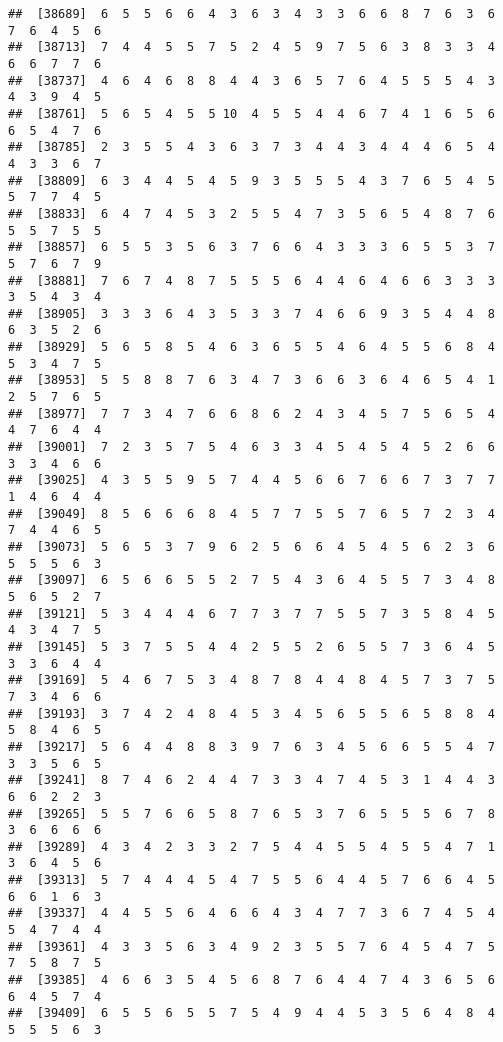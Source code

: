 \documentclass[
]{book}
\begin{document}
\begin{verbatim}
##  [38689]  6  5  5  6  6  4  3  6  3  4  3  3  6  6  8  7  6  3  6  7  6  4  5  6
##  [38713]  7  4  4  5  5  7  5  2  4  5  9  7  5  6  3  8  3  3  4  6  6  7  7  6
##  [38737]  4  6  4  6  8  8  4  4  3  6  5  7  6  4  5  5  5  4  3  4  3  9  4  5
##  [38761]  5  6  5  4  5  5 10  4  5  5  4  4  6  7  4  1  6  5  6  6  5  4  7  6
##  [38785]  2  3  5  5  4  3  6  3  7  3  4  4  3  4  4  4  6  5  4  4  3  3  6  7
##  [38809]  6  3  4  4  5  4  5  9  3  5  5  5  4  3  7  6  5  4  5  5  7  7  4  5
##  [38833]  6  4  7  4  5  3  2  5  5  4  7  3  5  6  5  4  8  7  6  5  5  7  5  5
##  [38857]  6  5  5  3  5  6  3  7  6  6  4  3  3  3  6  5  5  3  7  5  7  6  7  9
##  [38881]  7  6  7  4  8  7  5  5  5  6  4  4  6  4  6  6  3  3  3  3  5  4  3  4
##  [38905]  3  3  3  6  4  3  5  3  3  7  4  6  6  9  3  5  4  4  8  6  3  5  2  6
##  [38929]  5  6  5  8  5  4  6  3  6  5  5  4  6  4  5  5  6  8  4  5  3  4  7  5
##  [38953]  5  5  8  8  7  6  3  4  7  3  6  6  3  6  4  6  5  4  1  2  5  7  6  5
##  [38977]  7  7  3  4  7  6  6  8  6  2  4  3  4  5  7  5  6  5  4  4  7  6  4  4
##  [39001]  7  2  3  5  7  5  4  6  3  3  4  5  4  5  4  5  2  6  6  3  3  4  6  6
##  [39025]  4  3  5  5  9  5  7  4  4  5  6  6  7  6  6  7  3  7  7  1  4  6  4  4
##  [39049]  8  5  6  6  6  8  4  5  7  7  5  5  7  6  5  7  2  3  4  7  4  4  6  5
##  [39073]  5  6  5  3  7  9  6  2  5  6  6  4  5  4  5  6  2  3  6  5  5  5  6  3
##  [39097]  6  5  6  6  5  5  2  7  5  4  3  6  4  5  5  7  3  4  8  5  6  5  2  7
##  [39121]  5  3  4  4  4  6  7  7  3  7  7  5  5  7  3  5  8  4  5  4  3  4  7  5
##  [39145]  5  3  7  5  5  4  4  2  5  5  2  6  5  5  7  3  6  4  5  3  3  6  4  4
##  [39169]  5  4  6  7  5  3  4  8  7  8  4  4  8  4  5  7  3  7  5  7  3  4  6  6
##  [39193]  3  7  4  2  4  8  4  5  3  4  5  6  5  5  6  5  8  8  4  5  8  4  6  5
##  [39217]  5  6  4  4  8  8  3  9  7  6  3  4  5  6  6  5  5  4  7  3  3  5  6  5
##  [39241]  8  7  4  6  2  4  4  7  3  3  4  7  4  5  3  1  4  4  3  6  6  2  2  3
##  [39265]  5  5  7  6  6  5  8  7  6  5  3  7  6  5  5  5  6  7  8  3  6  6  6  6
##  [39289]  4  3  4  2  3  3  2  7  5  4  4  5  5  4  5  5  4  7  1  3  6  4  5  6
##  [39313]  5  7  4  4  4  5  4  7  5  5  6  4  4  5  7  6  6  4  5  6  6  1  6  3
##  [39337]  4  4  5  5  6  4  6  6  4  3  4  7  7  3  6  7  4  5  4  5  4  7  4  4
##  [39361]  4  3  3  5  6  3  4  9  2  3  5  5  7  6  4  5  4  7  5  7  5  8  7  5
##  [39385]  4  6  6  3  5  4  5  6  8  7  6  4  4  7  4  3  6  5  6  6  4  5  7  4
##  [39409]  6  5  5  6  5  5  7  5  4  9  4  4  5  3  5  6  4  8  4  5  5  5  6  3

\end{verbatim}
\end{document}
